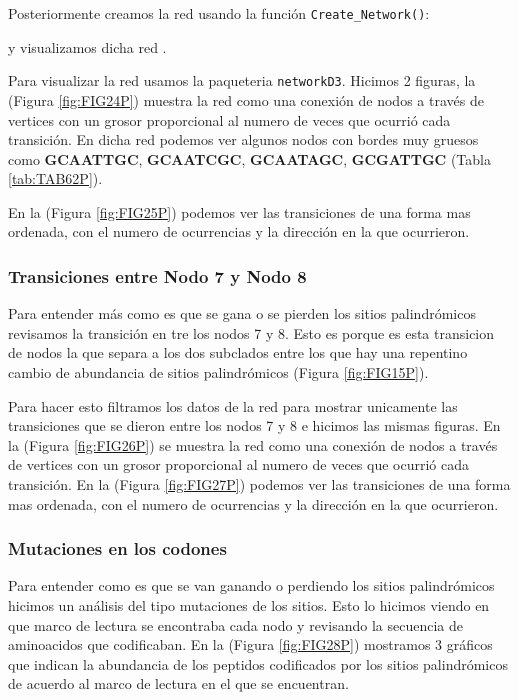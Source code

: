 \documentclass[
]{book}
\begin{document}
Posteriormente creamos la red usando la función \texttt{Create\_Network()}:

y visualizamos dicha red .

Para visualizar la red usamos la paqueteria \texttt{networkD3}. Hicimos 2 figuras, la (Figura \ref{fig:FIG24P}) muestra la red como una conexión de nodos a través de vertices con un grosor proporcional al numero de veces que ocurrió cada transición. En dicha red podemos ver algunos nodos con bordes muy gruesos como \textbf{GCAATTGC}, \textbf{GCAATCGC}, \textbf{GCAATAGC}, \textbf{GCGATTGC} (Tabla \ref{tab:TAB62P}).

En la (Figura \ref{fig:FIG25P}) podemos ver las transiciones de una forma mas ordenada, con el numero de ocurrencias y la dirección en la que ocurrieron.

\hypertarget{transiciones-entre-nodo-7-y-nodo-8-1}{%
\subsubsection{Transiciones entre Nodo 7 y Nodo 8}\label{transiciones-entre-nodo-7-y-nodo-8-1}}

Para entender más como es que se gana o se pierden los sitios palindrómicos revisamos la transición en tre los nodos 7 y 8. Esto es porque es esta transicion de nodos la que separa a los dos subclados entre los que hay una repentino cambio de abundancia de sitios palindrómicos (Figura \ref{fig:FIG15P}).

Para hacer esto filtramos los datos de la red para mostrar unicamente las transiciones que se dieron entre los nodos 7 y 8 e hicimos las mismas figuras.
En la (Figura \ref{fig:FIG26P}) se muestra la red como una conexión de nodos a través de vertices con un grosor proporcional al numero de veces que ocurrió cada transición. En la (Figura \ref{fig:FIG27P}) podemos ver las transiciones de una forma mas ordenada, con el numero de ocurrencias y la dirección en la que ocurrieron.

\hypertarget{mutaciones-en-los-codones-6}{%
\subsubsection{Mutaciones en los codones}\label{mutaciones-en-los-codones-6}}

Para entender como es que se van ganando o perdiendo los sitios palindrómicos hicimos un análisis del tipo mutaciones de los sitios. Esto lo hicimos viendo en que marco de lectura se encontraba cada nodo y revisando la secuencia de aminoacidos que codificaban. En la (Figura \ref{fig:FIG28P}) mostramos 3 gráficos que indican la abundancia de los peptidos codificados por los sitios palindrómicos de acuerdo al marco de lectura en el que se encuentran.
\end{document}
